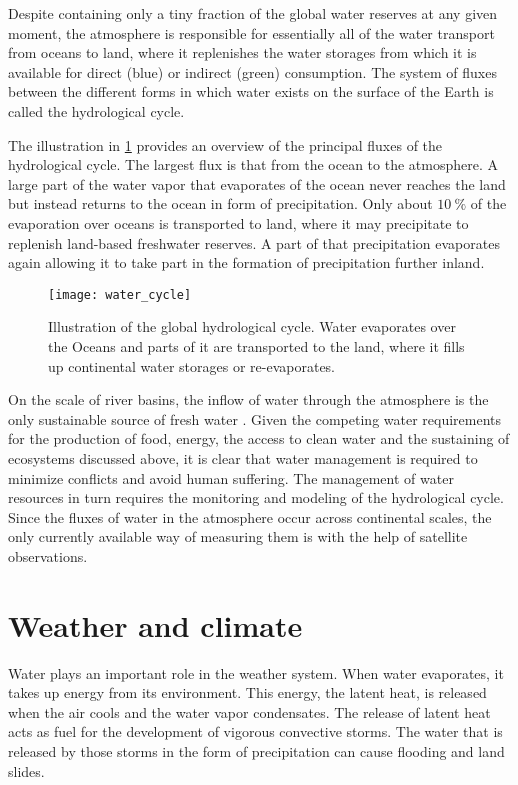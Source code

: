 Despite containing only a tiny fraction of the global water reserves at any
given moment, the atmosphere is responsible for essentially all of the water
transport from oceans to land, where it replenishes the water storages from
which it is available for direct (blue) or indirect (green) consumption. The
system of fluxes between the different forms in which water exists on the
surface of the Earth is called the hydrological cycle.

The illustration in
\ref{fig:introduction:water_cycle} provides an overview of the principal fluxes
of the hydrological cycle. The largest flux is that from the ocean to the
atmosphere. A large part of the water vapor that evaporates of the ocean never
reaches the land but instead returns to the ocean in form of precipitation. Only
about $\SI{10}{\percent}$ of the evaporation over oceans is transported to land,
where it may precipitate to replenish land-based freshwater reserves. A part of
that precipitation evaporates again allowing it to take part in the formation of
precipitation further inland.

\begin{figure}
\centering
\texttt{[image: water\_cycle]}
\caption{
Illustration of the global hydrological cycle. Water evaporates over the
Oceans and parts of it are transported to the land, where it fills up continental
water storages or re-evaporates.}
\label{fig:introduction:water_cycle}
\end{figure}

On the scale of river basins, the inflow of water through the atmosphere is the
only sustainable source of fresh water \citep{falkenmark04}. Given the competing
water requirements for the production of food, energy, the access to clean water
and the sustaining of ecosystems discussed above, it is clear that water
management is required to minimize conflicts and avoid human suffering. The
management of water resources in turn requires the monitoring and modeling of
the hydrological cycle. Since the fluxes of water in the atmosphere occur across
continental scales, the only currently available way of measuring them is with
the help of satellite observations.

\section{Weather and climate}

Water plays an important role in the weather system. When water evaporates, it
takes up energy from its environment. This energy, the latent heat, is released
when the air cools and the water vapor condensates. The release of latent heat
acts as fuel for the development of vigorous convective storms. The water that
is released by those storms in the form of precipitation can cause flooding and
land slides.

